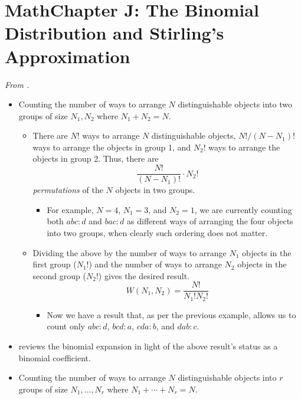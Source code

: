 \documentclass[../notes.tex]{subfiles}
\begin{document}
\section{MathChapter J: The Binomial Distribution and Stirling's Approximation}
\emph{From \textcite{bib:McQuarrieSimon}.}
\begin{itemize}
    \item {}Counting the number of ways to arrange $N$ distinguishable objects into two groups of size $N_1,N_2$ where $N_1+N_2=N$.
    \begin{itemize}
        \item There are $N!$ ways to arrange $N$ distinguishable objects, $N!/(N-N_1)!$ ways to arrange the objects in group 1, and $N_2!$ ways to arrange the objects in group 2. Thus, there are
        \begin{equation*}
            \frac{N!}{(N-N_1)!}\cdot N_2!
        \end{equation*}
        \emph{permutations} of the $N$ objects in two groups.
        \begin{itemize}
            \item For example, $N=4$, $N_1=3$, and $N_2=1$, we are currently counting both $abc:d$ and $bac:d$ as different ways of arranging the four objects into two groups, when clearly such ordering does not matter.
        \end{itemize}
        \item Dividing the above by the number of ways to arrange $N_1$ objects in the first group ($N_1!$) and the number of ways to arrange $N_2$ objects in the second group ($N_2!$) gives the desired result.
        \begin{equation*}
            W(N_1,N_2) = \frac{N!}{N_1!N_2!}
        \end{equation*}
        \begin{itemize}
            \item Now we have a result that, as per the previous example, allows us to count only $abc:d$, $bcd:a$, $cda:b$, and $dab:c$.
        \end{itemize}
    \end{itemize}
    \item \textcite{bib:McQuarrieSimon} reviews the binomial expansion in light of the above result's status as a binomial coefficient.
    \item Counting the number of ways to arrange $N$ distinguishable objects into $r$ groups of size $N_1,\dots,N_r$ where $N_1+\cdots+N_r=N$.
    \begin{equation*}

\end{equation*}
\end{itemize}
\end{document}
